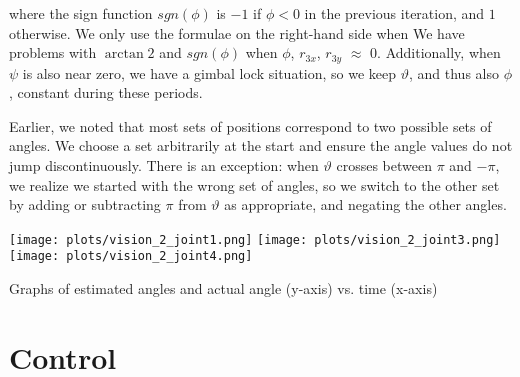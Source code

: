 \documentclass[11pt, a4paper]{article}
\begin{document}
    where the sign function $sgn(\phi)$ is $-1$ if $\phi < 0$ in the previous iteration, and $1$ otherwise.
    We only use the formulae on the right-hand side when 
    We have problems with $\arctan2$ and $sgn(\phi)$ when $\phi$, 
    $r_{3x}$, $r_{3y}$ $\approx$ $0$.
     Additionally, when $\psi$ is also near zero, we have a
     gimbal lock situation, so we keep $\vartheta$, and thus also $\phi$,
     constant during these periods.

     Earlier, we noted that most sets of positions correspond
     to two possible sets of angles. We choose a set arbitrarily at the start and ensure
     the angle values do not jump discontinuously.
     There is an exception: when $\vartheta$ crosses between $\pi$ and $-\pi$,
     we realize we started with the wrong set of angles,
     so we switch to the other set by adding or subtracting $\pi$ from $\vartheta$
     as appropriate, and negating the other angles.
     
    \begin{center}     
        \texttt{[image: plots/vision\_2\_joint1.png]}
        \texttt{[image: plots/vision\_2\_joint3.png]}
        \texttt{[image: plots/vision\_2\_joint4.png]}
    \end{center}
    Graphs of estimated angles and actual angle (y-axis) vs.  time (x-axis) 


    \section{Control}
\end{document}
